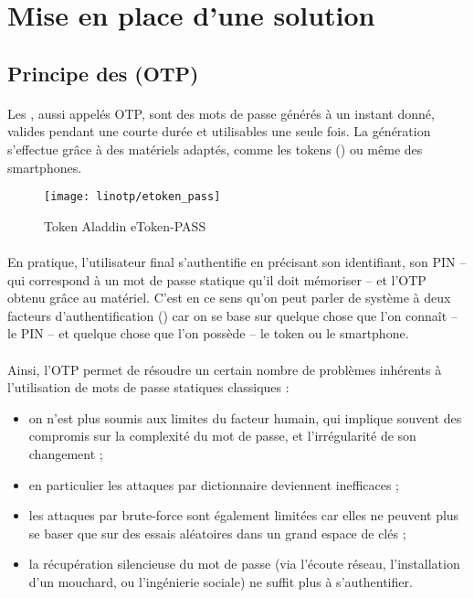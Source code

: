 \section{Mise en place d'une solution \alinotp{}}
\label{section:linotp}

\subsection{Principe des  (OTP)}

\paragraph{}
Les , aussi appelés OTP, sont des mots de passe générés à un instant donné, valides pendant une courte durée et utilisables une seule fois.
La génération s'effectue grâce à des matériels adaptés, comme les tokens () ou même des smartphones.

\begin{figure}
	\centering
	\texttt{[image: linotp/etoken\_pass]}
	\caption{Token Aladdin eToken-PASS}
	\label{figure:linotp:token}
\end{figure}

\paragraph{}
En pratique, l'utilisateur final s'authentifie en précisant son identifiant, son PIN -- qui correspond à un mot de passe statique qu'il doit mémoriser -- et l'OTP obtenu grâce au matériel.
C'est en ce sens qu'on peut parler de système à deux facteurs d'authentification () car on se base sur quelque chose que l'on connaît -- le PIN -- et quelque chose que l'on possède -- le token ou le smartphone.

\paragraph{}
Ainsi, l'OTP permet de résoudre un certain nombre de problèmes inhérents à l'utilisation de mots de passe statiques classiques :

\begin{itemize}
	\item on n'est plus soumis aux limites du facteur humain, qui implique souvent des compromis sur la complexité du mot de passe, et l'irrégularité de son changement ;
	\item en particulier les attaques par dictionnaire deviennent inefficaces ;
	\item les attaques par brute-force sont également limitées car elles ne peuvent plus se baser que sur des essais aléatoires dans un grand espace de clés ;
	\item la récupération silencieuse du mot de passe (via l'écoute réseau, l'installation d'un mouchard, ou l'ingénierie sociale) ne suffit plus à s'authentifier.
\end{itemize}

